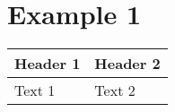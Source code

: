 \section{Example 1}\label{example-1}

\begin{longtable}[c]{@{}ll@{}}
\toprule
Header 1 & Header 2\tabularnewline
\midrule
\endhead
Text 1 & Text 2\tabularnewline
\bottomrule
\end{longtable}
